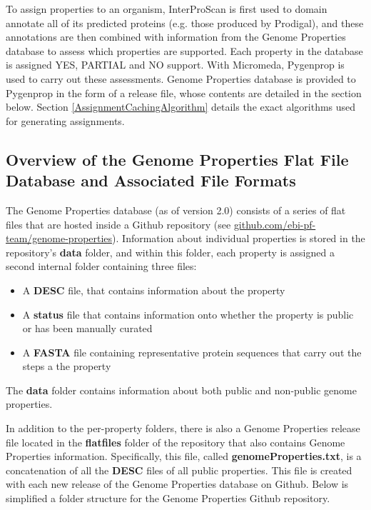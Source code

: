 To assign properties to an organism, InterProScan is first used to domain annotate all of its predicted proteins (e.g. those produced by Prodigal), and these annotations are then combined with information from the Genome Properties database to assess which properties are supported. Each property in the database is assigned YES, PARTIAL and NO support. With Micromeda, Pygenprop is used to carry out these assessments. Genome Properties database is provided to Pygenprop in the form of a release file, whose contents are detailed in the section below. Section \ref{AssignmentCachingAlgorithm} details the exact algorithms used for generating assignments.  

\subsection{Overview of the Genome Properties Flat File Database and Associated File Formats} \label{Genome-Properties-Files} 

The Genome Properties database (as of version 2.0) consists of a series of flat files that are hosted inside a Github repository (see \href{github.com/ebi-pf-team/genome-properties}{github.com/ebi-pf-team/genome-properties}). Information about individual properties is stored in the repository's \textbf{data} folder, and within this folder, each property is assigned a second internal folder containing three files: 
\begin{itemize}
\item A \textbf{DESC} file, that contains information about the property
\item A \textbf{status} file that contains information onto whether the property is public or has been manually curated
\item A \textbf{FASTA} \cite{pearson19905} file containing representative protein sequences that carry out the steps a the property
\end{itemize}
The \textbf{data} folder contains information about both public and non-public genome properties. 

In addition to the per-property folders, there is also a Genome Properties release file located in the \textbf{flatfiles} folder of the repository that also contains Genome Properties information. Specifically, this file, called \textbf{genomeProperties.txt}, is a concatenation of all the \textbf{DESC} files of all public properties. This file is created with each new release of the Genome Properties database on Github. Below is simplified a folder structure for the Genome Properties Github repository.

